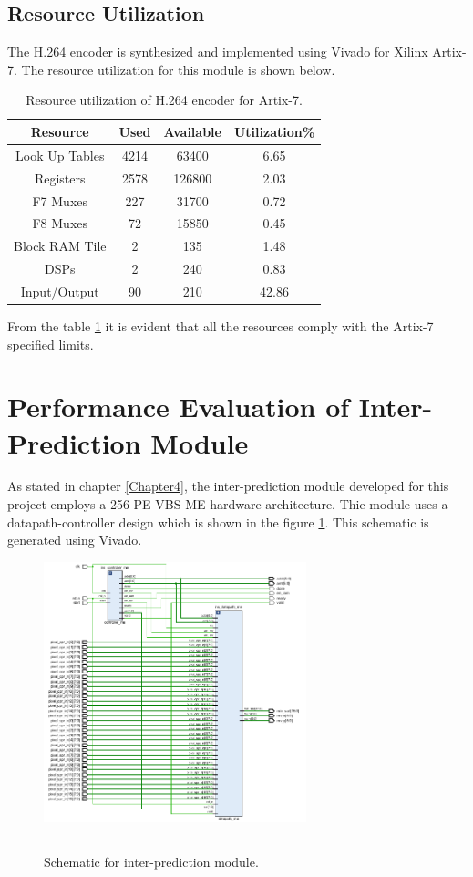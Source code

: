 \subsection{Resource Utilization}
The H.264 encoder is synthesized and implemented using Vivado for Xilinx Artix-7. The resource utilization for this module is shown below.
\begin{table}[H]
	\centering
	\begin{tabular}{|c|c|c|c|} \hline
		\textbf{Resource} & \textbf{Used} & \textbf{Available} & \textbf{Utilization\%}  \\ \hline
		Look Up Tables & 4214 & 63400 & 6.65 \\ \hline
		Registers 	  & 2578 & 126800 & 2.03 \\ \hline
		F7 Muxes      & 227 & 31700 & 0.72 \\ \hline
		F8 Muxes      & 72 & 15850 & 0.45 \\ \hline 
		Block RAM Tile & 2 & 135 & 1.48 \\ \hline
		DSPs & 2 & 240 & 0.83 \\ \hline
		Input/Output   & 90 & 210 & 42.86 \\ \hline 
	\end{tabular}
	\caption{Resource utilization of H.264 encoder for Artix-7.}
	\label{tab:resource_ec}
\end{table}
From the table \ref{tab:resource_ec} it is evident that all the resources comply with the Artix-7 specified limits. 

\section{Performance Evaluation of Inter-Prediction Module}
As stated in chapter \ref{Chapter4}, the inter-prediction module developed for this project employs a 256 PE VBS ME hardware architecture. Thie module uses a datapath-controller design which is shown in the figure \ref{fig:mehardware}. This schematic is generated using Vivado. 
\begin{figure}[H]
	\centering
	\includegraphics[width = 3in]{./Figures/mehardware.png}
	\rule{35em}{0.5pt}
	\caption{Schematic for inter-prediction module.}
	\label{fig:mehardware}
\end{figure}
